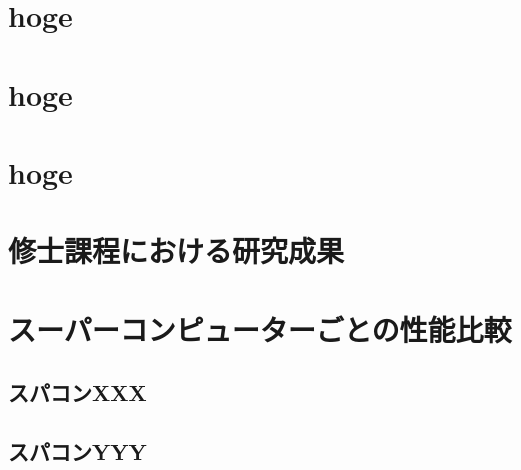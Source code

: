 \documentclass[
    openany,oneside,
    paper=a4paper,
    book,
    fontsize=12pt,
    jafontsize=12pt,
    head_space=30mm]{jlreq}
\begin{document}
\chapter{hoge}

\chapter{hoge}

\chapter{hoge}





\acknowledge

\lipsum[1-8]


% 
% 

\appendix
\label{ch:app}
\pagestyle{appendix}

\chapter{修士課程における研究成果}
\label{ch:app_master}

\lipsum[1-8]

\chapter{スーパーコンピューターごとの性能比較}
\label{ch:app_sx}

\lipsum[1-2]

\section{スパコンXXX}
\label{sec:app_xxx}

\lipsum[1-4]

\section{スパコンYYY}
\label{sec:app_yyy}

\lipsum[1-4]


\end{document}
